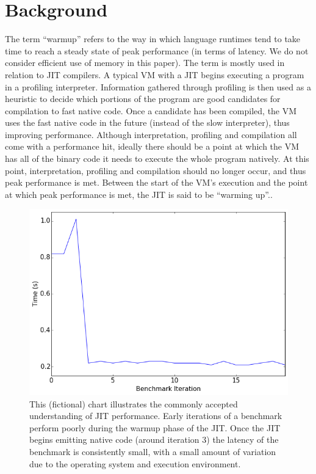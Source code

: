 \documentclass[10pt,preprint]{sigplanconf}
\begin{document}
\section{Background}
\label{sec:warmup}

The term ``warmup'' refers to the way in which language runtimes tend to take
time to reach a steady state of peak performance (in terms of latency. We do
not consider efficient use of memory in this paper).  The term is mostly used
in relation to JIT compilers. A typical VM
with a JIT begins executing a program in a profiling interpreter. Information
gathered through profiling is then used as a heuristic to decide which portions
of the program are good candidates for compilation to fast native code. Once a
candidate has been compiled, the VM uses the fast native code in the future
(instead of the slow interpreter), thus improving performance.  Although
interpretation, profiling and compilation all come with a performance hit,
ideally there should be a point at which the VM has all of the binary code it
needs to execute the whole program natively. At this point, interpretation,
profiling and compilation should no longer occur, and thus peak performance is
met. Between the start of the VM's execution and the point at which peak
performance is met, the JIT is said to be ``warming up''..

\begin{figure}[h!]
\centering
\includegraphics[width=.4\textwidth]{img/trad}
\caption{ This (fictional) chart illustrates the commonly accepted understanding
of JIT performance. Early iterations of a benchmark perform poorly during the
warmup phase of the JIT. Once the JIT begins emitting native code (around
iteration 3) the latency of the benchmark is consistently small, with a small
amount of variation due to the operating system and execution environment.}
\label{fig:trad}
\end{figure}
\end{document}
